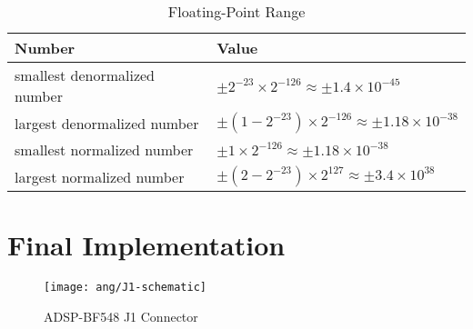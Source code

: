 \begin{table}[H]
\centering
\caption{Floating-Point Range}
\label{floating-point-range}
\begin{tabu} to \textwidth {XX}
\toprule
Number &Value\\
\hline
smallest denormalized number &$\pm 2^{-23} \times 2^{-126} \approx \pm 1.4 \times 10^{-45}$\\
\hline
largest denormalized number &$\pm (1-2^{-23}) \times 2^{-126} \approx \pm 1.18 \times 10^{-38}$\\
\hline
smallest normalized number &$\pm 1 \times 2^{-126} \approx \pm 1.18 \times 10^{-38}$\\
\hline
largest normalized number &$\pm (2-2^{-23}) \times 2^{127} \approx \pm 3.4 \times 10^{38}$\\
\bottomrule
\end{tabu}
\end{table}


\section{Final Implementation}

\begin{figure}[H]
\centering
\texttt{[image: ang/J1-schematic]}
\caption{ADSP-BF548 J1 Connector \cite{bf548-manual}}
\label{J1-schematic}
\end{figure}
